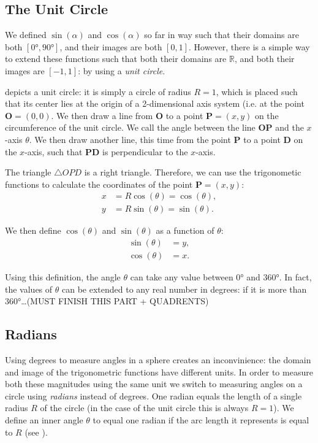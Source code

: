 \subsection{The Unit Circle}
We defined $\sin(\alpha)$ and $\cos(\alpha)$ so far in way such that their domains are both $[\ang{0},\ang{90}]$, and their images are both $[0,1]$. However, there is a simple way to extend these functions such that both their domains are $\mathbb{R}$, and both their images are $[-1,1]$: by using a \emph{unit circle}.

 depicts a unit circle: it is simply a circle of radius $R=1$, which is placed such that its center lies at the origin of a 2-dimensional axis system (i.e. at the point $\bm{O}=(0,0)$. We then draw a line from $\bm{O}$ to a point $\bm{P}=(x,y)$ on the circumference of the unit circle. We call the angle between the line $\bm{OP}$ and the $x$-axis $\theta$. We then draw another line, this time from the point $\bm{P}$ to a point $\bm{D}$ on the $x$-axis, such that $\bm{PD}$ is perpendicular to the $x$-axis.

The triangle $\triangle OPD$ is a right triangle. Therefore, we can use the trigonometic functions to calculate the coordinates of the point $\bm{P}=(x,y)$:
\begin{align}
	x &= R\cos(\theta) = \cos(\theta),\nonumber\\
	y &= R\sin(\theta) = \sin(\theta).
	\label{eq:xy_P}
\end{align}

We then define $\cos(\theta)$ and $\sin(\theta)$ as a function of $\theta$:
\begin{align}
	\sin(\theta) &= y,\nonumber\\
	\cos(\theta) &= x.
	\label{eq:unit circle definition of sin and cos}
\end{align}

Using this definition, the angle $\theta$ can take any value between $\ang{0}$ and $\ang{360}$. In fact, the values of $\theta$ can be extended to any real number in degrees: if it is more than $\ang{360}$\ldots (MUST FINISH THIS PART + QUADRENTS)

\subsection{Radians}
Using degrees to measure angles in a sphere creates an inconvinience: the domain and image of the trigonometric functions have different units. In order to measure both these magnitudes using the same unit we switch to measuring angles on a circle using \emph{radians} instead of degrees. One radian equals the length of a single radius $R$ of the circle (in the case of the unit circle this is always $R=1$). We define an inner angle $\theta$ to equal one radian if the arc length it represents is equal to $R$ (see ).

